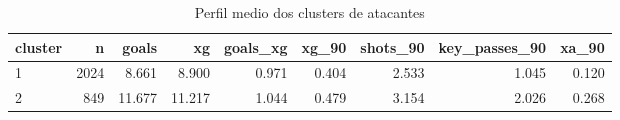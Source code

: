 \begin{table}

\caption{\label{tab:cluster_perfis}Perfil medio dos clusters de atacantes}
\centering
\begin{tabular}[t]{lrrrrrrrr}
\toprule
cluster & n & goals & xg & goals\_xg & xg\_90 & shots\_90 & key\_passes\_90 & xa\_90\\
\midrule
1 & 2024 & 8.661 & 8.900 & 0.971 & 0.404 & 2.533 & 1.045 & 0.120\\
2 & 849 & 11.677 & 11.217 & 1.044 & 0.479 & 3.154 & 2.026 & 0.268\\
\bottomrule
\end{tabular}
\end{table}
